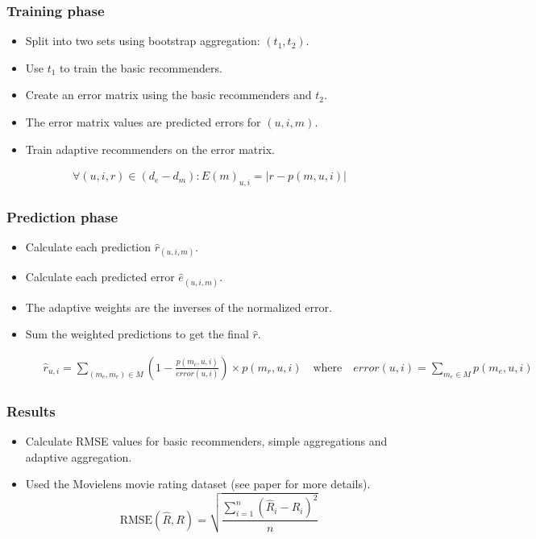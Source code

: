 \documentclass[screen]{beamer}
\begin{document}
\begin{frame}
  
\end{frame}

\begin{frame}
  \frametitle{Training phase}
  
  \begin{itemize}
    \item Split into two sets using bootstrap aggregation: $(t_1,t_2)$.
    \item Use $t_1$ to train the basic recommenders.
    \item Create an error matrix using the basic recommenders and $t_2$. 
    \item The error matrix values are predicted errors for $(u,i,m)$.
    \item Train adaptive recommenders on the error matrix.
  \end{itemize}
  
  \begin{eqnarray}
    \forall (u,i,r) \in (d_e - d_m): E(m)_{u,i} = |r - p(m,u,i)|
  \end{eqnarray}
\end{frame}

\begin{frame}
  \frametitle{Prediction phase}
  
  \begin{itemize}
    \item Calculate each prediction $\hat{r}_{(u,i,m)}$.
    \item Calculate each predicted error $\hat{e}_{(u,i,m)}$.
    \item The adaptive weights are the inverses of the normalized error.
    \item Sum the weighted predictions to get the final $\hat{r}$.
  \end{itemize}
  
  \begin{figure}[!t]
  \tiny
  \begin{eqnarray}
    \label{eq:adaptive}
    \hat{r}_{u,i} = \sum_{(m_{e}, m_{r}) \in M} (1 - 
    \frac{
      p(m_{e},u,i)
    }{
      error(u,i)
    }) \times p(m_{r},u,i)
    \quad
    \text{where}
    \quad
    error(u,i) = \sum_{m_e \in M} p(m_e,u,i) 
  \end{eqnarray}
  \end{figure}
\end{frame}

\begin{frame}
  \frametitle{Results}
  \begin{itemize}
    \item Calculate RMSE values for basic recommenders, simple aggregations and adaptive aggregation.
    \item Used the Movielens movie rating dataset (see paper for more details).
    \vspace{2em}
    \begin{equation}
      \mathrm{RMSE}(\hat{R},R)
      = \sqrt{\frac{
          \sum_{i=1}^{n} (\hat{R}_i - R_i)^2
        }{
          n
        }}
    \end{equation}
  \end{itemize}
\end{frame}
\end{document}

